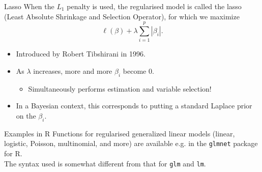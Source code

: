 \documentclass[10pt,handout]{beamer}
\begin{document}
\begin{frame}{Lasso}
When the $L_1$ penalty is used, the regularised model is called the {\color{uured}lasso} (Least Absolute Shrinkage and Selection Operator), for which we maximize
$$\ell(\beta)+\lambda\sum_{i=1}^p|\beta_i|.$$
\begin{itemize}
\item Introduced by Robert Tibshirani in 1996.\\[3mm]\pause
\item As $\lambda$ increases, more and more $\beta_i$ become 0.\pause
\begin{itemize}
\item Simultaneously performs estimation and variable selection!\\[3mm]\pause
\end{itemize}
\item In a Bayesian context, this corresponds to putting a standard Laplace prior on the $\beta_i$.
\end{itemize}
\end{frame}

\begin{frame}{Examples in R}
Functions for regularised generalized linear models (linear, logistic, Poisson, multinomial, and more) are available e.g. in the \texttt{glmnet} package for R.\\[3mm]\pause
The syntax used is somewhat different from that for \texttt{glm} and \texttt{lm}.\\[3mm]
\end{frame}
\end{document}

